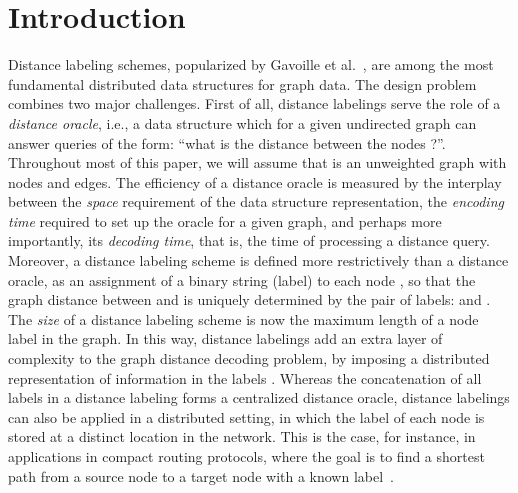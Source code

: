 \documentclass{article}[11pt,letter]
\begin{document}
\thispagestyle{empty}


\newpage

\section{Introduction}
Distance labeling schemes, popularized by Gavoille et al.~\cite{Gavoille:2004:DLG:1036161.1036165}, are among the most fundamental distributed data structures for graph data. The design problem combines two major challenges. First of all, distance labelings serve the role of a \emph{distance oracle}, i.e., a data structure which for a given undirected graph  can answer queries of the form: ``what is the distance between the nodes ?''. Throughout most of this paper, we will assume that  is an unweighted graph with  nodes and  edges. The efficiency of a distance oracle is measured by the interplay between the \emph{space} requirement of the data structure representation, the \emph{encoding time} required to set up the oracle for a given graph, and perhaps more importantly, its \emph{decoding time}, that is, the time of processing a  distance query. Moreover, a distance labeling scheme is defined more restrictively than a distance oracle, as an assignment of a binary string (label)  to each node , so that the graph distance between  and  is uniquely determined by the pair of labels:  and . The \emph{size} of a distance labeling scheme is now the maximum length of a node label in the graph. In this way, distance labelings add an extra layer of complexity to the graph distance decoding problem, by imposing a distributed representation of information in the labels . Whereas the concatenation of all  labels in a distance labeling forms a centralized distance oracle, distance labelings can also be applied in a distributed setting, in which the label of each node is stored at a distinct location in the network. This is the case, for instance, in applications in compact routing protocols, where the goal is to find a shortest path from a source node to a target node with a known label~\cite{ChepoiDEHVX12}.
\end{document}
